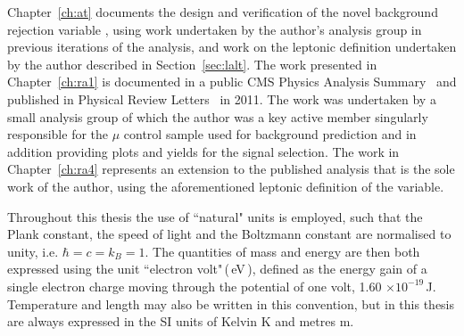 Chapter~\ref{ch:at} documents the design and verification of the novel background rejection variable \alt, using work undertaken by the author's analysis group in previous iterations of the analysis, and work on the leptonic definition undertaken by the author described in Section~\ref{sec:lalt}. The work presented in Chapter~\ref{ch:ra1} is documented in a public CMS Physics Analysis Summary~\cite{1fbnote} and published in Physical Review Letters~\cite{PRL1fb} in 2011. The work was undertaken by a small analysis group of which the author was a key active member singularly responsible for the $\mu$ control sample used for background prediction and in addition providing plots and yields for the signal selection. The work in Chapter~\ref{ch:ra4} represents an extension to the published analysis that is the sole work of the author, using the aforementioned leptonic definition of the \alt variable. 

Throughout this thesis the use of ``natural" units is employed, such that the Plank constant, the speed of light and the Boltzmann constant are normalised to unity, i.e. $\hbar = c =  k_{B} = 1$. The quantities of mass and energy are then both expressed using the unit ``electron volt"\,(\,eV\,), defined as the energy gain of a single electron charge moving through the potential of one volt, 1.60 $\times 10^{-19}$\,J. Temperature and length may also be written in this convention, but in this thesis are always expressed in the SI units of Kelvin K and metres m. 